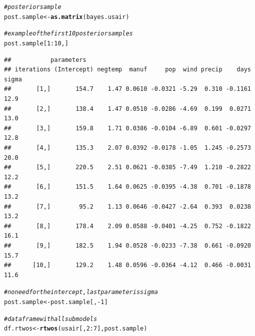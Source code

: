 \documentclass[11pt,a4paper,twoside]{book}\usepackage[]{graphicx}\usepackage[]{color}
\makeatletter
\newcommand{\hlnum}[1]{\textcolor[rgb]{0.686,0.059,0.569}{#1}}%
\newcommand{\hlcom}[1]{\textcolor[rgb]{0.678,0.584,0.686}{\textit{#1}}}%
\newcommand{\hlopt}[1]{\textcolor[rgb]{0,0,0}{#1}}%
\newcommand{\hlstd}[1]{\textcolor[rgb]{0.345,0.345,0.345}{#1}}%
\newcommand{\hlkwb}[1]{\textcolor[rgb]{0.69,0.353,0.396}{#1}}%
\newcommand{\hlkwd}[1]{\textcolor[rgb]{0.737,0.353,0.396}{\textbf{#1}}}%
\newenvironment{kframe}{%
 \def\at@end@of@kframe{}%
 \ifinner\ifhmode%
  \def\at@end@of@kframe{\end{minipage}}%
  \begin{minipage}{\columnwidth}%
 \fi\fi%
 \def\FrameCommand##1{\hskip\@totalleftmargin \hskip-\fboxsep
 \colorbox{shadecolor}{##1}\hskip-\fboxsep
     \hskip-\linewidth \hskip-\@totalleftmargin \hskip\columnwidth}%
 \MakeFramed {\advance\hsize-\width
   \@totalleftmargin\z@ \linewidth\hsize
   \@setminipage}}%
 {\par\unskip\endMakeFramed%
 \at@end@of@kframe}
\newenvironment{knitrout}{}{} %
\makeatother
\begin{document}
\begin{knitrout}
\begin{kframe}
\begin{alltt}
\hlcom{#posterior sample}
\hlstd{post.sample} \hlkwb{<-} \hlkwd{as.matrix}\hlstd{(bayes.usair)}

\hlcom{#example of the first 10 posterior samples}
\hlstd{post.sample[}\hlnum{1}\hlopt{:}\hlnum{10}\hlstd{,]}
\end{alltt}
\begin{verbatim}
##           parameters
## iterations (Intercept) negtemp  manuf     pop  wind precip    days sigma
##       [1,]       154.7    1.47 0.0610 -0.0321 -5.29  0.310 -0.1161  12.9
##       [2,]       138.4    1.47 0.0510 -0.0286 -4.69  0.199  0.0271  13.0
##       [3,]       159.8    1.71 0.0386 -0.0104 -6.89  0.601 -0.0297  12.8
##       [4,]       135.3    2.07 0.0392 -0.0178 -1.05  1.245 -0.2573  20.0
##       [5,]       220.5    2.51 0.0621 -0.0385 -7.49  1.210 -0.2822  12.2
##       [6,]       151.5    1.64 0.0625 -0.0395 -4.38  0.701 -0.1878  13.2
##       [7,]        95.2    1.13 0.0646 -0.0427 -2.64  0.393  0.0238  13.2
##       [8,]       178.4    2.09 0.0588 -0.0401 -4.25  0.752 -0.1822  16.1
##       [9,]       182.5    1.94 0.0528 -0.0233 -7.38  0.661 -0.0920  15.7
##      [10,]       129.2    1.48 0.0596 -0.0364 -4.12  0.466 -0.0031  11.6
\end{verbatim}
\begin{alltt}
\hlcom{#no need for the intercept, last parameter is sigma}
\hlstd{post.sample} \hlkwb{<-} \hlstd{post.sample[,}\hlopt{-}\hlnum{1}\hlstd{]}

\hlcom{#data frame with all submodels}
\hlstd{df.rtwos} \hlkwb{<-}\hlkwd{rtwos}\hlstd{(usair[,}\hlnum{2}\hlopt{:}\hlnum{7}\hlstd{], post.sample)}


\end{alltt}
\end{kframe}
\end{knitrout}
\end{document}
